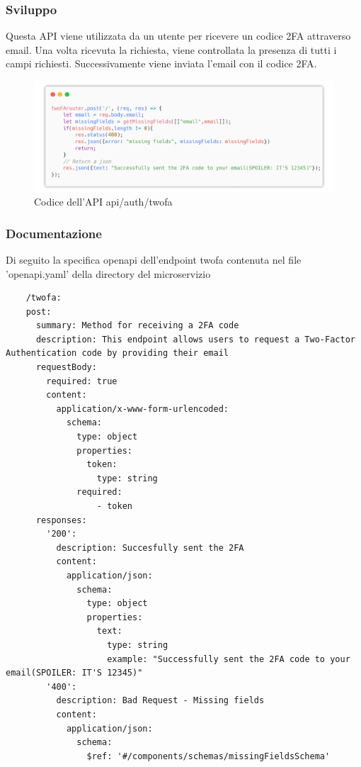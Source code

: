 \documentclass{report}
\begin{document}
\subsubsection*{Sviluppo}
Questa API viene utilizzata da un utente per ricevere un codice 2FA attraverso email.
Una volta ricevuta la richiesta, viene controllata la presenza di tutti i campi richiesti.
Successivamente viene inviata l'email con il codice 2FA.

\begin{figure}[H]
	\centering\includegraphics[width=1\textwidth]{images/microservizio-autenticazione/twofa-carbon.png}
	Codice dell'API api/auth/twofa
\end{figure}

\subsubsection*{Documentazione}
Di seguito la specifica openapi dell'endpoint twofa contenuta nel file 'openapi.yaml' della directory del microservizio
\begin{verbatim}
	/twofa:
    post:
      summary: Method for receiving a 2FA code 
      description: This endpoint allows users to request a Two-Factor Authentication code by providing their email
      requestBody:
        required: true
        content:
          application/x-www-form-urlencoded:
            schema:
              type: object
              properties:
                token:
                  type: string
              required:
                  - token
      responses:
        '200':
          description: Succesfully sent the 2FA
          content:
            application/json:
              schema:
                type: object
                properties:
                  text:
                    type: string
                    example: "Successfully sent the 2FA code to your email(SPOILER: IT'S 12345)"
        '400':
          description: Bad Request - Missing fields 
          content:
            application/json:
              schema:
                $ref: '#/components/schemas/missingFieldsSchema'
                     
     
\end{verbatim}
\end{document}
